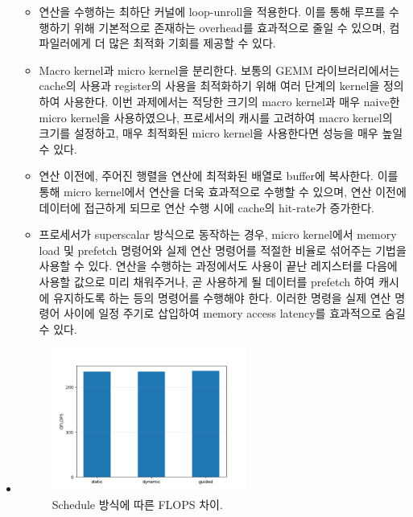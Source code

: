 \begin{itemize}
{        \begin{itemize}
            \item {
                연산을 수행하는 최하단 커널에 loop-unroll을 적용한다. 이를 통해 루프를 수행하기 위해
                기본적으로 존재하는 overhead를 효과적으로 줄일 수 있으며, 컴파일러에게 더 많은
                최적화 기회를 제공할 수 있다.
            }
            \item {
                Macro kernel과 micro kernel을 분리한다. 보통의 GEMM 라이브러리에서는 cache의 사용과
                register의 사용을 최적화하기 위해 여러 단계의 kernel을 정의하여 사용한다.
                이번 과제에서는 적당한 크기의 macro kernel과 매우 naive한 micro kernel을
                사용하였으나, 프로세서의 캐시를 고려하여 macro kernel의 크기를 설정하고,
                매우 최적화된 micro kernel을 사용한다면 성능을 매우 높일 수 있다.
            }
            \item {
                연산 이전에, 주어진 행렬을 연산에 최적화된 배열로 buffer에 복사한다.
                이를 통해 micro kernel에서 연산을 더욱 효과적으로 수행할 수 있으며,
                연산 이전에 데이터에 접근하게 되므로 연산 수행 시에 cache의 hit-rate가 증가한다.
            }
            \item {
                프로세서가 superscalar 방식으로 동작하는 경우, micro kernel에서 memory load 및
                prefetch 명령어와 실제 연산 명령어를 적절한 비율로 섞어주는 기법을 사용할 수 있다.
                연산을 수행하는 과정에서도 사용이 끝난 레지스터를 다음에 사용할 값으로 미리 채워주거나,
                곧 사용하게 될 데이터를 prefetch 하여 캐시에 유지하도록 하는 등의 명령어를 수행해야 한다.
                이러한 명령을 실제 연산 명령어 사이에 일정 주기로 삽입하여 memory access latency를
                효과적으로 숨길 수 있다.
            }
        \end{itemize}
    }
    \item {
        \begin{figure}[t]
            \centering
            \includegraphics[width=0.6\textwidth]{imgs/schedule_policy.png}
            \caption{Schedule 방식에 따른 FLOPS 차이.}\label{fig:schedule_policy}
        \end{figure}

}
\end{itemize}
